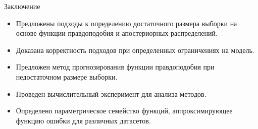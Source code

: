 \documentclass[10pt]{beamer}
\begin{document}
\begin{frame}{Заключение}
    \begin{itemize}
        \item Предложены подходы к определению достаточного размера выборки на основе функции правдоподобия и апостериорных распределений.
        \item Доказана корректность подходов при определенных ограничениях на модель.
        \item Предложен метод прогнозирования функции правдоподобия при недостаточном размере выборки.
        \item Проведен вычислительный эксперимент для анализа методов.
        \item Определено параметрическое семейство функций, аппроксимирующее функцию ошибки для различных датасетов.
    \end{itemize}
\end{frame}
\end{document}
